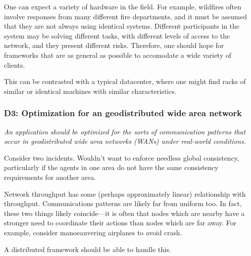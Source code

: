One can expect a variety of hardware in the field. For example,
wildfires often involve responses from many different fire
departments, and it must be assumed that they are not always using
identical systems. Different participants in the system may be solving
different tasks, with different levels of access to the network, and
they present different risks. Therefore, one should hope for
frameworks that are as general as possible to accomodate a wide
variety of clients.

This can be contrasted with a typical datacenter, where one might find
racks of similar or identical machines with similar characteristics.

\subsubsection*{D3: Optimization for an geodistributed wide area network}

\emph{An application should be optimized for the sorts of
communication patterns that occur in geodistributed wide area networks
(WANs) under real-world conditions.}

Consider two incidents. Wouldn't want to enforce needless global
consistency, particularly if the agents in one area do not have the
same consistency requirements for another area.

Network throughput has some (perhaps approximately linear)
relationship with throughput. Communications patterns are likely far
from uniform too. In fact, these two things likely coincide---it is
often that nodes which are nearby have a stronger need to coordinate
their actions than nodes which are far away. For example, consider
manoeauvering airplanes to avoid crash.

A distributed framework should be able to handle this.
